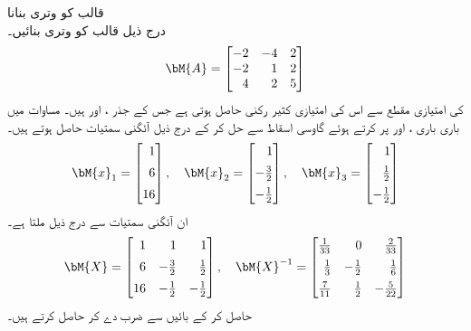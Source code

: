 \quad قالب کو وتری بنانا\\
درج ذیل قالب کو وتری بنائیں۔
\begin{align*}
\bM{A}=\begin{bmatrix*}[r]-2&-4&2\\-2&1&2\\4&2&5  \end{bmatrix*}
\end{align*}
 کی امتیازی مقطع سے اس کی امتیازی کثیر رکنی  حاصل ہوتی ہے جس کے جذر ،  اور  ہیں۔ مساوات  میں باری باری ،  اور  پر کرتے ہوئے گاوسی اسقاط سے حل کر کے درج ذیل آئگنی سمتیات حاصل ہوتے ہیں۔
\begin{align*}
\bM{x}_1=\begin{bmatrix*}[r]1 \\[0.5em] 6 \\[0.5em] 16  \end{bmatrix*}, \quad \bM{x}_2=\begin{bmatrix*}[r]1 \\[0.5em] -\tfrac{3}{2} \\[0.5em] -\tfrac{1}{2}  \end{bmatrix*},\quad \bM{x}_3=\begin{bmatrix*}[r]1 \\[0.5em] \tfrac{1}{2} \\[0.5em]-\tfrac{1}{2}  \end{bmatrix*}
\end{align*}
ان آئگنی سمتیات سے درج ذیل ملتا ہے۔
\begin{align*}
\bM{X}=\begin{bmatrix*}[r] 1&1&1\\[0.5em] 6&-\tfrac{3}{2}&\tfrac{1}{2}\\[0.5em] 16&-\tfrac{1}{2}& -\tfrac{1}{2} \end{bmatrix*}, \quad 
\bM{X}^{-1}=\begin{bmatrix*}[r] \tfrac{1}{33}&0&\tfrac{2}{33}\\[0.5em]\tfrac{1}{3}&-\tfrac{1}{2}&\tfrac{1}{6}\\[0.5em]
\tfrac{7}{11}&\tfrac{1}{2}&-\tfrac{5}{22}\end{bmatrix*}
\end{align*}
 حاصل کر کے بائیں  سے ضرب دے کر  حاصل کرتے ہیں۔
